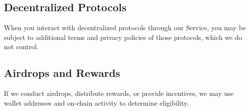 \documentclass[12pt]{article}
\begin{document}
\subsection{Decentralized Protocols}
When you interact with decentralized protocols through our Service, you may be subject to additional terms and privacy policies of those protocols, which we do not control.

\subsection{Airdrops and Rewards}
If we conduct airdrops, distribute rewards, or provide incentives, we may use wallet addresses and on-chain activity to determine eligibility.
\end{document}
